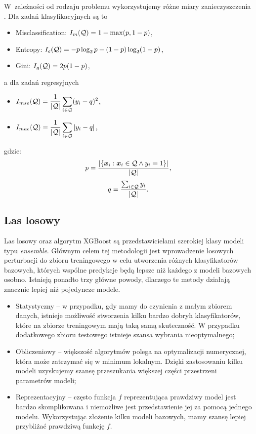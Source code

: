 \documentclass[inzynierska]{pwr_wmat_praca_dyplomowa}
\theoremstyle{plain}
\numberwithin{theorem}{chapter}
\theoremstyle{definition}
\numberwithin{theorem}{chapter}
\begin{document}
W~zależności od rodzaju problemu wykorzystujemy różne miary zanieczyszczenia \cite{sklearn_api}. Dla zadań klasyfikacyjnych są to
\begin{itemize}
	\item Misclassification: $I_m(\mathcal{Q}) = 1 - \max(p, 1 - p)$,
	\item Entropy: $I_e(\mathcal{Q}) = -p \log_2 p - (1 - p) \log_2(1 - p)$,
	\item Gini: $I_g(\mathcal{Q}) = 2p(1 - p)$,
\end{itemize}{}
a dla zadań regresyjnych
\begin{itemize}
	\item $ \displaystyle I_{mse}(\mathcal{Q}) = \frac{1}{|\mathcal{Q}|} \sum_{i \in \mathcal{Q}} (y_i - q)^2$,
	\item $ \displaystyle I_{mae}(\mathcal{Q}) = \frac{1}{|\mathcal{Q}|} \sum_{i \in \mathcal{Q}} |y_i - q|$,
\end{itemize}
gdzie:
$$ p = \frac{| \{ \boldsymbol{x}_i : \boldsymbol{x}_i \in \mathcal{Q} \land y_i = 1 \}|}{|\mathcal{Q}|} \text{,} $$
$$ q = \frac{\sum_{i \in \mathcal{Q}} y_i}{|\mathcal{Q}|} \text{.} $$

\subsection{Las losowy}
Las losowy oraz algorytm XGBoost są przedstawicielami szerokiej klasy modeli typu \textit{ensemble}. Głównym celem tej metodologii jest wprowadzenie losowych perturbacji do zbioru treningowego w celu utworzenia różnych klasyfikatorów bazowych, których wspólne predykcje będą lepsze niż każdego z modeli bazowych osobno. Istnieją ponadto trzy główne powody, dlaczego te metody działają znacznie lepiej niż pojedyncze modele.
\begin{itemize}
	\item Statystyczny -- w przypadku, gdy mamy do czynienia z małym zbiorem danych, istnieje możliwość stworzenia kilku bardzo dobryh klasyfikatorów, które na zbiorze treningowym mają taką samą skuteczność. W przypadku dodatkowego zbioru testowego istnieje szansa wybrania nieoptymalnego;
	\item Obliczeniowy -- większość algorytmów polega na optymalizacji numerycznej, która może zatrzymać się w minimum lokalnym. Dzięki zastosowaniu kilku modeli uzyskujemy szansę przeszukania większej części przestrzeni parametrów modeli;
	\item Reprezentacyjny -- często funkcja $f$ reprezentująca prawdziwy model jest bardzo skomplikowana i niemożliwe jest przedstawienie jej za pomocą jednego modelu. Wykorzystując złożenie kilku modeli bazowych, mamy szansę lepiej przybliżać prawdziwą funkcję $f$.
\end{itemize}
\end{document}
